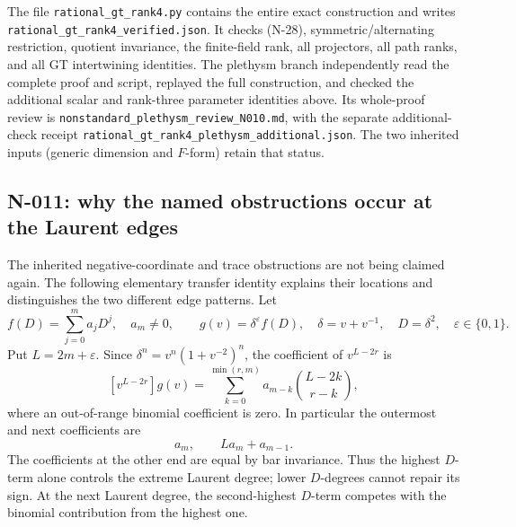 The file \nolinkurl{rational_gt_rank4.py} contains the entire exact
construction and writes \nolinkurl{rational_gt_rank4_verified.json}.
It checks (N-28), symmetric/alternating restriction, quotient invariance,
the finite-field rank, all projectors, all path ranks, and all GT
intertwining identities.  The plethysm branch independently read the complete proof and script,
replayed the full construction, and checked the additional scalar and
rank-three parameter identities above.  Its whole-proof review is
\nolinkurl{nonstandard_plethysm_review_N010.md}, with the separate
additional-check receipt
\nolinkurl{rational_gt_rank4_plethysm_additional.json}.  The two
inherited inputs (generic dimension and $F$-form) retain that status.


\subsection{N-011: why the named obstructions occur at the Laurent edges}
\label{sec:nonstandard-edges}

The inherited negative-coordinate and trace obstructions are not being
claimed again.  The following elementary transfer identity explains
their locations and distinguishes the two different edge patterns.
Let
\[
 f(D)=\sum_{j=0}^m a_jD^j,\quad a_m\ne0,\qquad
 g(v)=\delta^\varepsilon f(D),\quad
 \delta=v+v^{-1},\quad D=\delta^2,\quad\varepsilon\in\{0,1\}.
\]
Put $L=2m+\varepsilon$.  Since
$\delta^n=v^n(1+v^{-2})^n$, the coefficient of $v^{L-2r}$ is
\[
 [v^{L-2r}]g(v)=
 \sum_{k=0}^{\min(r,m)}
 a_{m-k}\binom{L-2k}{r-k},
 \tag{N-33}
\]
where an out-of-range binomial coefficient is zero.  In particular
the outermost and next coefficients are
\[
             a_m,\qquad La_m+a_{m-1}.
 \tag{N-34}
\]
The coefficients at the other end are equal by bar invariance.
Thus the highest $D$-term alone controls the extreme Laurent degree;
lower $D$-degrees cannot repair its sign.  At the next Laurent degree,
the second-highest $D$-term competes with the binomial contribution
from the highest one.

